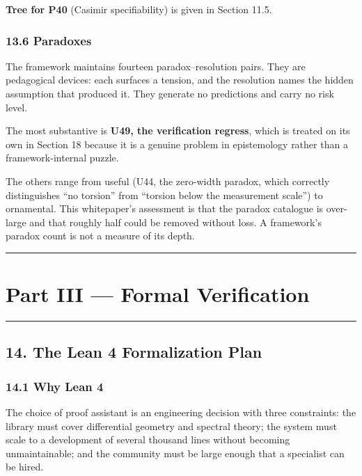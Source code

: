 \documentclass[
  11pt]{report}
\begin{document}
\textbf{Tree for P40} (Casimir specifiability) is given in Section 11.5.

\hypertarget{paradoxes}{%
\section{13.6 Paradoxes}\label{paradoxes}}

The framework maintains fourteen paradox--resolution pairs. They are
pedagogical devices: each surfaces a tension, and the resolution names
the hidden assumption that produced it. They generate no predictions and
carry no risk level.

The most substantive is \textbf{U49, the verification regress}, which is
treated on its own in Section 18 because it is a genuine problem in
epistemology rather than a framework-internal puzzle.

The others range from useful (U44, the zero-width paradox, which
correctly distinguishes ``no torsion'' from ``torsion below the
measurement scale'') to ornamental. This whitepaper's assessment is that
the paradox catalogue is over-large and that roughly half could be
removed without loss. A framework's paradox count is not a measure of
its depth.

\begin{center}\rule{0.5\linewidth}{0.5pt}\end{center}

\hypertarget{part-iii-formal-verification}{%
\part{Part III --- Formal
Verification}\label{part-iii-formal-verification}}

\begin{center}\rule{0.5\linewidth}{0.5pt}\end{center}

\hypertarget{the-lean-4-formalization-plan}{%
\chapter{14. The Lean 4 Formalization
Plan}\label{the-lean-4-formalization-plan}}

\hypertarget{why-lean-4}{%
\section{14.1 Why Lean 4}\label{why-lean-4}}

The choice of proof assistant is an engineering decision with three
constraints: the library must cover differential geometry and spectral
theory; the system must scale to a development of several thousand lines
without becoming unmaintainable; and the community must be large enough
that a specialist can be hired.
\end{document}

